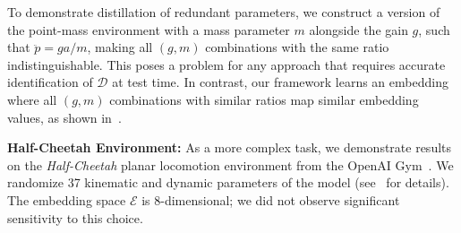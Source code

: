 \documentclass{article}
\newcommand{\TODO}[1]{\textcolor{red}{\textbf{TODO: #1}}}
\newcommand{\plain}{\emph{plain}}
\newcommand{\idset}{\mathcal{D}}
\newcommand{\latset}{\mathcal{E}}
\begin{document}
To demonstrate distillation of redundant parameters, %
we construct a version of the point-mass environment with a mass parameter $m$ alongside the gain $g$, such that $\ddot p = ga/m$,
making all $(g, m)$ combinations with the same ratio indistinguishable. %
This poses a problem for any approach that requires accurate identification of $\idset$ at test time.
In contrast, our framework learns an embedding where all $(g, m)$ combinations with similar ratios map similar embedding values,
as shown in~.

\textbf{Half-Cheetah Environment:}
As a more complex task, we demonstrate results on the \emph{Half-Cheetah}
planar locomotion environment from the OpenAI Gym~\citep{openai-gym}.
We randomize 37 kinematic and dynamic parameters of the model (see~ for details).
The embedding space $\latset$ is 8-dimensional; we did not observe significant sensitivity to this choice.
\end{document}

